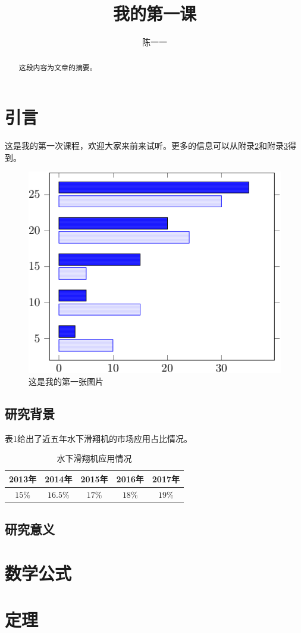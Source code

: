 \documentclass[12pt]{article}
\begin{document}
\title{我的第一课}
\author{陈一一}
\date{}
\maketitle

\tableofcontents

\begin{abstract}
这段内容为文章的摘要。
\end{abstract}

\newpage
\section{引言}
这是我的第一次课程，欢迎大家来前来试听。更多的信息可以从附录\ref{app:mafor}和附录\ref{app:theo}得到。

\begin{figure}[htb]
\centering
\includegraphics[scale=1]{fig1}
\caption{这是我的第一张图片}
\end{figure}

\subsection{研究背景}
表1给出了近五年水下滑翔机的市场应用占比情况\cite{Sherman2001The,Webb2001SLOCUM}。
\begin{table}[htb]
\centering
\caption{水下滑翔机应用情况}
\begin{tabular}{ccccc}
\hline
2013年&2014年&2015年&2016年&2017年\\
\hline
$15\%$&$16.5\%$&$17\%$&$18\%$&$19\%$\\
\hline
\end{tabular}
\end{table}

\subsection{研究意义}
\newpage



\newpage
\appendix
\appendixpage
\addappheadtotoc
\section{数学公式}\label{app:mafor}
\section{定理}\label{app:theo}
\end{document}
